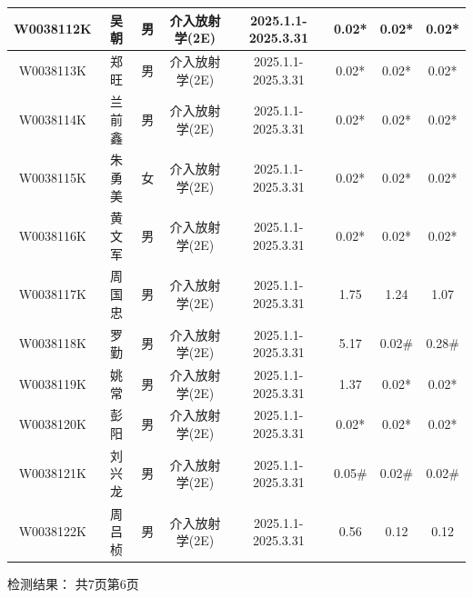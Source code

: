 \begin{table}[H]
\begin{tabular}{|c|c|c|c|c|c|c|c|}
\hline
W0038112K & 吴朝 & 男 & 介入放射学(2E) & 2025.1.1-2025.3.31 & 0.02* & 0.02* & 0.02* \\
\hline
W0038113K & 郑旺 & 男 & 介入放射学(2E) & 2025.1.1-2025.3.31 & 0.02* & 0.02* & 0.02* \\
\hline
W0038114K & 兰前鑫 & 男 & 介入放射学(2E) & 2025.1.1-2025.3.31 & 0.02* & 0.02* & 0.02* \\
\hline
W0038115K & 朱勇美 & 女 & 介入放射学(2E) & 2025.1.1-2025.3.31 & 0.02* & 0.02* & 0.02* \\
\hline
W0038116K & 黄文军 & 男 & 介入放射学(2E) & 2025.1.1-2025.3.31 & 0.02* & 0.02* & 0.02* \\
\hline
W0038117K & 周国忠 & 男 & 介入放射学(2E) & 2025.1.1-2025.3.31 & 1.75 & 1.24 & 1.07 \\
\hline
W0038118K & 罗勤 & 男 & 介入放射学(2E) & 2025.1.1-2025.3.31 & 5.17 & 0.02\# & 0.28\# \\
\hline
W0038119K & 姚常 & 男 & 介入放射学(2E) & 2025.1.1-2025.3.31 & 1.37 & 0.02* & 0.02* \\
\hline
W0038120K & 彭阳 & 男 & 介入放射学(2E) & 2025.1.1-2025.3.31 & 0.02* & 0.02* & 0.02* \\
\hline
W0038121K & 刘兴龙 & 男 & 介入放射学(2E) & 2025.1.1-2025.3.31 & 0.05\# & 0.02\# & 0.02\# \\
\hline
W0038122K & 周吕桢 & 男 & 介入放射学(2E) & 2025.1.1-2025.3.31 & 0.56 & 0.12 & 0.12 \\
\hline
\end{tabular}
\end{table}


检测结果：
共7页第6页

